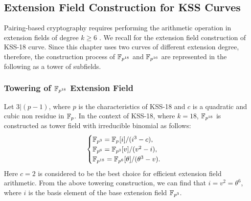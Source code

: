 %



\subsection{Extension Field Construction for KSS Curves}
Pairing-based cryptography requires  performing the arithmetic operation in extension fields of degree $k \geq 6$ \cite{Silverman}. 
We recall  for the extension field construction of KSS-18 curve.
Since this chapter uses two curves of different extension degree, therefore, the construction process of $\mathbb{F}_{p^{18}}$ and $\mathbb{F}_{p^{16}}$ are represented in the following as a tower of subfields. 

\subsubsection{Towering of \texorpdfstring{$\mathbb{F}_{p^{18}}$}{} Extension Field}
Let $3|(p-1)$, where $p$ is the characteristics of KSS-18 and $c$ is a quadratic and cubic non residue in ${\mathbb{F}}_{p}$. In the context  of KSS-18, where $k=18$, $\mathbb{F}_{p^{18}}$ is constructed as tower field with irreducible binomial as follows:
\begin{equation}\label{eq:KSS-18_towering_chap_ijnc2017}
\begin{cases}
{\mathbb{F}}_{p^{3}} = {\mathbb{F}}_{p^{}}[i]/(i^3-c),  \\ 
{\mathbb{F}}_{p^{6}} = {\mathbb{F}}_{p^{3}}[v]/(v^2-i),  \\ 
{\mathbb{F}}_{p^{18}} = {\mathbb{F}}_{p^{6}}[\theta]/(\theta^3-v). \\ 
\end{cases}
\end{equation}
Here $c = 2$ is considered to be the best choice for efficient extension field arithmetic.
From the above towering construction, we can find that $i=v^2=\theta^6$, where $i$ is the basis element of the base extension field $\mathbb{F}_{p^3}$. 


